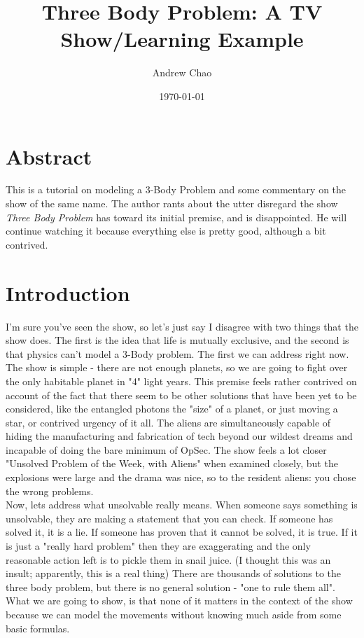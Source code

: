\documentclass[11pt]{article} %
\title{Three Body Problem: A TV Show/Learning Example}
\author{Andrew Chao}
\date{\today}
\begin{document}
\maketitle

\section{Abstract}
This is a tutorial on modeling a 3-Body Problem and some commentary on the show of the same name. The author rants about the utter disregard the show \emph{Three Body Problem} has toward its initial premise, and is disappointed. He will continue watching it because everything else is pretty good, although a bit contrived. 

\section{Introduction}

 I'm sure you've seen the show, so let's just say I disagree with two things that the show does. The first is the idea that life is mutually exclusive, and the second is that physics can't model a 3-Body problem. The first we can address right now.\\

The show is simple - there are not enough planets, so we are going to fight over the only habitable planet in "4" light years. This premise feels rather contrived on account of the fact that there seem to be other solutions that have been yet to be considered, like the entangled photons the "size" of a planet, or just moving a star, or contrived urgency of it all. The aliens are simultaneously capable of hiding the manufacturing and fabrication of tech beyond our wildest dreams and incapable of doing the bare minimum of OpSec. The show feels a lot closer "Unsolved Problem of the Week, with Aliens" when examined closely, but the explosions were large and the drama was nice, so to the resident aliens: you chose the wrong problems.\\

Now, lets address what unsolvable really means. When someone says something is unsolvable, they are making a statement that you can check. If someone has solved it, it is a lie. If someone has proven that it cannot be solved, it is true. If it is just a "really hard problem" then they are exaggerating and the only reasonable action left is to pickle them in snail juice. (I thought this was an insult; apparently, this is a real thing) There are thousands of solutions to the three body problem, but there is no general solution - "one to rule them all". What we are going to show, is that none of it matters in the context of the show because we can model the movements without knowing much aside from some basic formulas.\\
\end{document}
